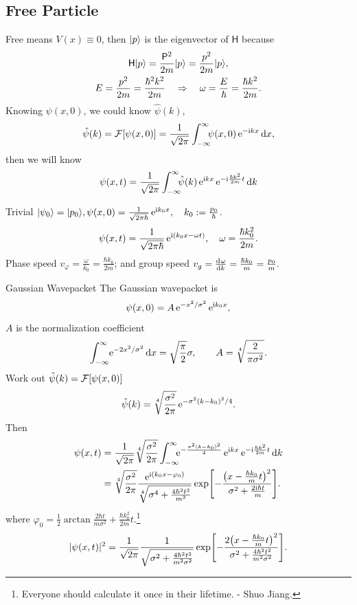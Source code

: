 \documentclass{article}
\newcommand*{\op}[1]{\mathsf{#1}}
\newcommand{\ko}[1]{\hspace{-#1 pt}}
\begin{document}
\subsection{Free Particle}
Free means $V(x)\equiv 0$, then $\lvert p\rangle$ is the eigenvector of $\op{H}$ because
\begin{gather*}
	\op{H}\ket p=\frac{\op{P}^2}{2m}\ket p=\frac{p^2}{2m}\ket p,\\
	E=\frac{p^2}{2m}=\frac{\hbar^2k^2}{2m}\quad\Rightarrow\quad\omega=\frac E\hbar=\frac{\hbar k^2}{2m}.
\end{gather*}
Knowing $\psi(x,0)$, we could know $\hat\psi(k)$,
$$\hat\psi(k)=\FT[\psi(x,0)]=\frac1{\sqrt{2\pi}}\intR \ko5\psi(x,0)\e^{-\i kx}\d x,$$
then we will know
$$\psi(x,t)=\frac1{\sqrt{2\pi}}\intR \ko5\hat\psi(k)\e^{\i kx}\e^{-\i\frac{\hbar k^2}{2m}t}\d k$$
\begin{example}{Trivial}{}
	$\lvert\psi_0\rangle=\lvert p_0\rangle,\psi(x,0)=\frac1{\sqrt{2\pi\hbar}}\mathop{}\!\mathrm{e}^{\mathrm{i} k_0x},\quad k_0:=\frac{p_0}\hbar$.
	$$\psi(x,t)=\frac1{\sqrt{2\pi\hbar}}\mathop{}\!\mathrm{e}^{\mathrm{i}(k_0x-\omega t)},\quad\omega=\frac{\hbar k^2_0}{2m}.$$
	Phase speed $v_\varphi=\frac\omega{k_0}=\frac{\hbar k_0}{2m}$; and group speed $v_g=\frac{\mathop{}\!\mathrm{d}^{}\omega}{\mathrm{d}{k}^{}}=\frac{\hbar k_0}m=\frac{p_0}m.$
\end{example}
\begin{example}{Gaussian Wavepacket}{}
	The Gaussian wavepacket is 
	$$\psi(x,0)=A\mathop{}\!\mathrm{e}^{-x^2/\sigma^2}\mathop{}\!\mathrm{e}^{\mathrm{i} k_0x},$$
	$A$ is the normalization coefficient
	$$\intR \ko2\e^{-2x^2/\sigma^2}\d x=\sqrt{\frac{\pi}2}\sigma,\qquad A=\sqrt[4]{\frac2{\pi\sigma^2}}.$$%
	Work out $\hat\psi(k)=\operatorname{\mathcal{F}}[\psi(x,0)]$
	$$\hat\psi(k)=\sqrt[4]{\frac{\sigma^2}{2\pi}}\mathop{}\!\mathrm{e}^{-\sigma^2(k-k_0)^2/4}.$$%
	Then
	\begin{align*}
		\psi(x,t) & =\frac1{\sqrt{2\pi}}\sqrt[4]{\frac{\sigma^2}{2\pi}}\intR \ko5\e^{-\frac{\sigma^2(k-k_0)^2}4}\e^{\i kx}\e^{-\i\frac{\hbar k^2}{2m}t}\d k                                               \\
		          & =\sqrt[4]{\frac{\sigma^2}{2\pi}}\frac{\e^{\i(k_0x-\varphi_0)}}{\sqrt[4]{\sigma^4+\frac{4\hbar^2t^2}{m^2}}}\exp\Biggl[-\frac{\bigl(x-\frac{\hbar k_0}mt\bigr)^2}{\sigma^2+\frac{2\i\hbar t}m}\Biggr].
	\end{align*}
	where $\varphi_0=\frac12\arctan\frac{2\hbar t}{m\sigma^2}+\frac{\hbar k_0^2}{2m}t$.\footnote{Everyone should calculate it once in their lifetime. - Shuo Jiang.}
	\begin{align*}
		\lvert\psi(x,t)\rvert^2=\frac1{\sqrt{2\pi}}\frac1{\sqrt{\sigma^2+\frac{4\hbar^2t^2}{m^2\sigma^2}}}\exp\Biggl[-\frac{2\bigl(x-\frac{\hbar k_0}mt\bigr)^2}{\sigma^2+\frac{4\hbar^2t^2}{m^2\sigma^2}}\Biggr].
	\end{align*}

\end{example}
\end{document}
